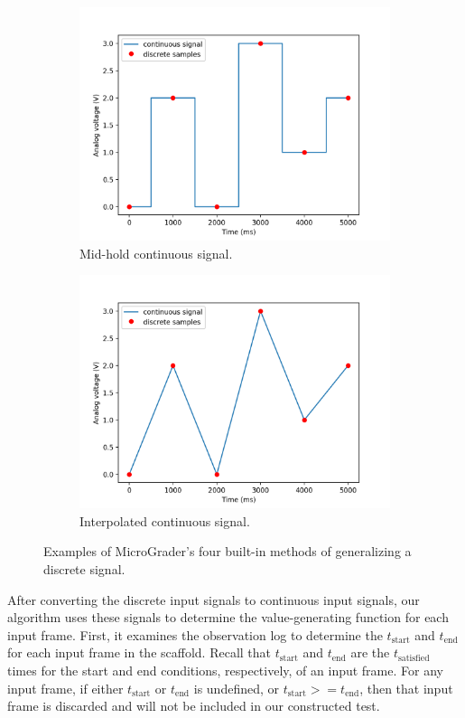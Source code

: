 \documentclass[12pt]{article}
\begin{document}
\begin{figure}
\begin{subfigure}[b]{.45\linewidth}
\includegraphics[width=\linewidth]{input-mid.png}
\caption{Mid-hold continuous signal.}
\end{subfigure}
\begin{subfigure}[b]{.45\linewidth}
\includegraphics[width=\linewidth]{input-inter.png}
\caption{Interpolated continuous signal.}
\end{subfigure}
\caption{Examples of MicroGrader's four built-in methods of generalizing a discrete signal.}
\label{fig:interpolation}
\end{figure}

After converting the discrete input signals to continuous input signals, our algorithm uses these signals to determine the value-generating function for each input frame.  First, it examines the observation log to determine the $t_{\text{start}}$ and $t_{\text{end}}$ for each input frame in the scaffold.  Recall that $t_{\text{start}}$ and $t_{\text{end}}$ are the $t_{\text{satisfied}}$ times for the start and end conditions, respectively, of an input frame.  For any input frame, if either $t_{\text{start}}$ or $t_{\text{end}}$ is undefined, or $t_{\text{start}} >= t_{\text{end}}$, then that input  frame is discarded and will not be included in our constructed test.
\end{document}
